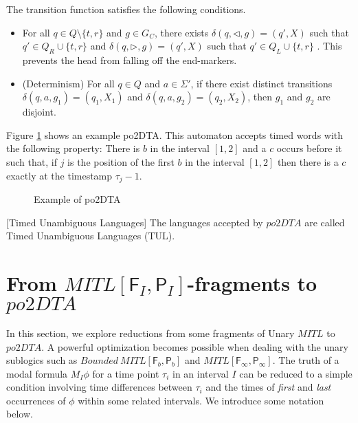 \documentclass{llncs}
\newcommand{\fut}{\textsf{F}}
\newcommand{\past}{\textsf{P}}
\newcommand{\rend}{\triangleleft}
\newcommand{\lend}{\triangleright}
\newcommand{\mitlfp}{\mbox{$\mathit{MITL[\fut_I,\past_I]}$}}
\newcommand{\bmitlfp}{\mbox{$\mathit{Bounded ~MITL[\fut_b,\past_b]}$}}
\newcommand{\potdta}{\mbox{$\mathit{po2DTA}$}}
\newcommand{\mitlfpinf}{\mbox{$\mathit{MITL[\fut_\infty,\past_\infty]}$}}
\newcommand{\mitlfpb}{\bmitlfp}
\begin{document}
The transition function satisfies the following conditions.
\begin{itemize}
\item For all $q\in Q\setminus\{t,r\}$ and $g\in G_C$, there exists $\delta(q,\rend,g)=(q',X)$ such that $q' \in Q_R\cup\{t,r\}$ and $\delta(q,\lend,g)=(q',X)$ such that $q' \in Q_L\cup\{t,r\}$ . This prevents the head from falling off the end-markers. 
\item (Determinism) For all $q \in Q$ and $a\in\Sigma'$, if there exist distinct transitions 
$\delta(q,a,g_1)=(q_1,X_1)$ and $\delta(q,a,g_2)=(q_2,X_2)$, then $g_1$ and $g_2$ are disjoint.
\end{itemize}

\begin{example}
\label{exam:potdta}
Figure \ref{exam:autex1} shows an example po2DTA. 
This automaton accepts timed words with the following property: 
There is  $b$ in the interval $[1,2]$ and a $c$ occurs before it such that, if $j$ is the position of 
the first $b$ in the 
interval $[1,2]$ then there is a $c$ exactly at the timestamp $\tau_j-1$.
\end{example}
\begin{figure}
\caption{Example of po2DTA}
\label{exam:autex1}
\end{figure}


\begin{definition}{[Timed Unambiguous Languages]}
The languages accepted by \potdta\/ are called Timed Unambiguous Languages (TUL).
\end{definition}



\section{From \mitlfp-fragments to \potdta}
In this section, we explore reductions from some fragments of Unary $\mathit{MITL}$ to \potdta. A powerful optimization becomes possible when dealing with the unary sublogics such as \mitlfpb\/ and \mitlfpinf. The truth of a modal formula $M_{I} \phi$ for a time point $\tau_i$ in an interval $I$ can be reduced to a simple condition involving time differences between $\tau_i$ and the times of \emph{first} and \emph{last} occurrences of $\phi$ within some  related intervals. We introduce some notation below.
\end{document}
